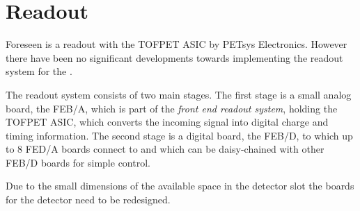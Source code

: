 \documentclass[../BTOF_summary.tex]{subfiles}
\begin{document}
\section{Readout}

Foreseen is a readout with the TOFPET ASIC by PETsys Electronics.
However there have been no significant developments towards implementing the readout system for the \btofD .

The readout system consists of two main stages.
The first stage is a small analog board, the FEB/A, which is part of the \textit{front end readout system}, holding the TOFPET ASIC, which converts the incoming signal into digital charge and timing information.
The second stage is a digital board, the FEB/D, to which up to 8 FED/A boards connect to and which can be daisy-chained with other FEB/D boards for simple control.

Due to the small dimensions of the available space in the detector slot the boards for the detector need to be redesigned.
\end{document}
